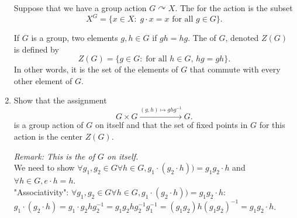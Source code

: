 \documentclass{amsart}
\begin{document}
\begin{enumerate}
\begin{enumerate}


    
\end{enumerate}



\vspace{0.2in}

Suppose that we have a group action $G\curvearrowright X$. The  for the action is the subset
\[
X^G = \{x\in X:\; g\cdot x = x\text{ for all $g\in G$}\}.
\]

If $G$ is a group, two elements $g,h\in G$  if $gh = hg$. The  of $G$, denoted $Z(G)$ is defined by
\[
Z(G) = \{g\in G:\;\text{for all $h\in G$, }hg = gh\}.
\]
In other words, it is the set of the elements of $G$ that commute with every other element of $G$.

\item Show that the assignment
\[
G\times G\xrightarrow{(g,h)\mapsto ghg^{-1}}G.
\]
is a group action of $G$ on itself and that the set of fixed points in $G$ for this action is the center $Z(G)$. 

\emph{Remark: This is the  of $G$ on itself.}\\

We need to show $\forall g_1,g_2\in G\forall h\in G,g_1\cdot(g_2\cdot h))=g_1g_2\cdot h$ and $\forall h\in G,e\cdot h=h$.\\

"Associativity": $\forall g_1,g_2\in G\forall h\in G,g_1\cdot(g_2\cdot h))=g_1g_2\cdot h$: $g_1\cdot(g_2\cdot h)=g_1\cdot g_2hg_2^{-1}=g_1g_2hg_2^{-1}g_1^{-1}=(g_1g_2)h(g_1g_2)^{-1}=g_1g_2\cdot h$.\\


\end{enumerate}
\end{document}
